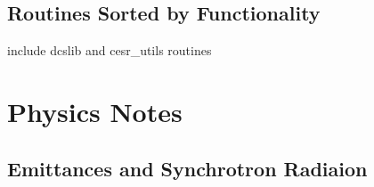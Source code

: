 \documentclass{book}
\begin{document}
\chapter{Routines Sorted by Functionality}

include dcslib and cesr\_utils routines

\part{Physics Notes}

\chapter{Emittances and Synchrotron Radiaion}



\begin{theindex}


\end{theindex}
\end{document}

